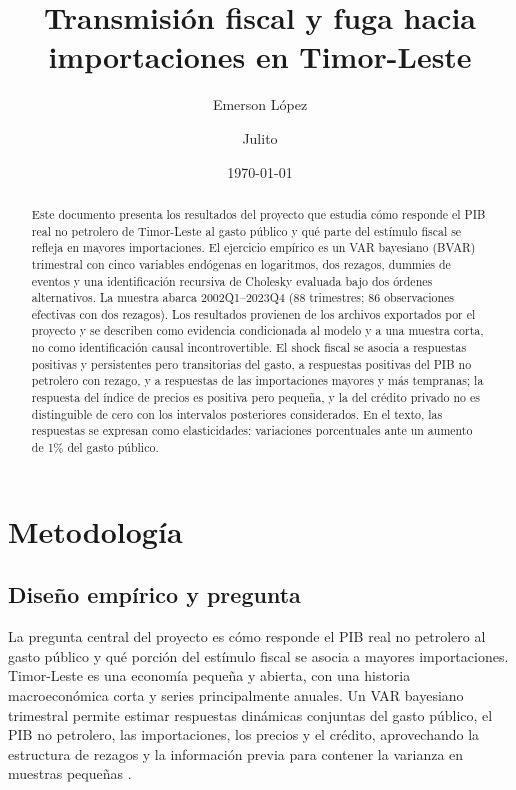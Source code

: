 \documentclass[11pt,a4paper]{article}
\title{\textbf{Transmisión fiscal y fuga hacia importaciones en Timor-Leste}}
\author{Emerson López \and Julito} %
\date{\today}
\begin{document}
\maketitle

\begin{abstract}
\noindent
Este documento presenta los resultados del proyecto que estudia cómo responde el PIB real no petrolero de Timor-Leste al gasto público y qué parte del estímulo fiscal se refleja en mayores importaciones. El ejercicio empírico es un VAR bayesiano (BVAR) trimestral con cinco variables endógenas en logaritmos, dos rezagos, dummies de eventos y una identificación recursiva de Cholesky evaluada bajo dos órdenes alternativos. La muestra abarca 2002Q1--2023Q4 (88 trimestres; 86 observaciones efectivas con dos rezagos). Los resultados provienen de los archivos exportados por el proyecto y se describen como evidencia condicionada al modelo y a una muestra corta, no como identificación causal incontrovertible. El shock fiscal se asocia a respuestas positivas y persistentes pero transitorias del gasto, a respuestas positivas del PIB no petrolero con rezago, y a respuestas de las importaciones mayores y más tempranas; la respuesta del índice de precios es positiva pero pequeña, y la del crédito privado no es distinguible de cero con los intervalos posteriores considerados. En el texto, las respuestas se expresan como elasticidades: variaciones porcentuales ante un aumento de 1\% del gasto público.
\end{abstract}

\section{Metodología}
\label{sec:metodologia}

\subsection{Diseño empírico y pregunta}
\label{sec:diseno}

La pregunta central del proyecto es cómo responde el PIB real no petrolero al
gasto público y qué porción del estímulo fiscal se asocia a
mayores importaciones. Timor-Leste es una economía pequeña y abierta, con
una historia macroeconómica corta y series principalmente anuales. Un VAR
bayesiano trimestral permite estimar respuestas dinámicas conjuntas del gasto
público, el PIB no petrolero, las importaciones, los precios y el crédito,
aprovechando la estructura de rezagos y la información previa para contener la
varianza en muestras pequeñas \parencite{litterman1986,giannone2015}.
\end{document}
